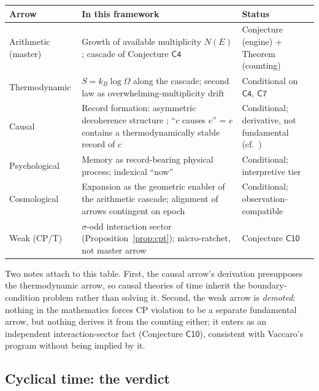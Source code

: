 \begin{center}
\begin{tabular}{@{}p{}p{}p{}@{}}
\toprule
Arrow & In this framework & Status\\
\midrule
Arithmetic (master) & Growth of available multiplicity $N(E)$; cascade of
Conjecture $\mathsf{C4}$ & Conjecture (engine) + Theorem (counting)\\
Thermodynamic & $S=k_{B}\log\Omega$ along the cascade; second law as
overwhelming-multiplicity drift & Conditional on $\mathsf{C4}$, $\mathsf{C7}$\\
Causal & Record formation: asymmetric decoherence structure
\cite{zurek2003,landauer1961}; ``$c$ causes $e$'' = $e$ contains a
thermodynamically stable record of $c$ & Conditional; derivative, not fundamental
(cf.\ \cite{malament1977,sorkin2003})\\
Psychological & Memory as record-bearing physical process; indexical ``now'' &
Conditional; interpretive tier\\
Cosmological & Expansion as the geometric enabler of the arithmetic cascade;
alignment of arrows contingent on epoch & Conditional; observation-compatible\\
Weak (CP/T) & $\sigma$-odd interaction sector (Proposition~\ref{prop:cpt});
micro-ratchet, not master arrow & Conjecture $\mathsf{C10}$\\
\bottomrule
\end{tabular}
\end{center}

Two notes attach to this table. First, the causal arrow's derivation presupposes the
thermodynamic arrow, so causal theories of time inherit the boundary-condition problem
rather than solving it. Second, the
weak arrow is \emph{demoted}: nothing in the
mathematics forces CP violation to be a separate fundamental arrow, but nothing derives it
from the counting either; it enters as an independent interaction-sector fact
(Conjecture $\mathsf{C10}$), consistent with Vaccaro's program \cite{vaccaro2016} without
being implied by it.

\subsection{Cyclical time: the verdict}


